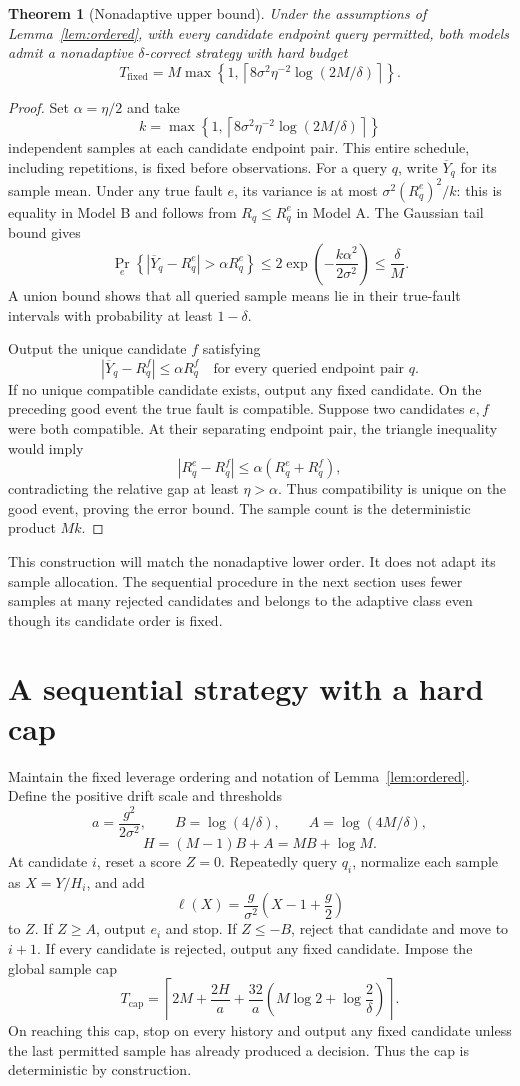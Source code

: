 \documentclass[11pt,letterpaper]{article}
\newtheorem{theorem}{Theorem}
\newcommand{\ceil}[1]{\left\lceil #1\right\rceil}
\begin{document}
\begin{theorem}[Nonadaptive upper bound]\label{thm:nonadaptive-upper}
Under the assumptions of Lemma~\ref{lem:ordered}, with every candidate endpoint query permitted, both models admit a nonadaptive $\delta$-correct strategy with hard budget
\[
 T_{\mathrm{fixed}}=M\max\left\{1,
 \ceil{8\sigma^2\eta^{-2}\log(2M/\delta)}\right\}.
\]
\end{theorem}
\begin{proof}
Set $\alpha=\eta/2$ and take
\[
 k=\max\left\{1,\ceil{8\sigma^2\eta^{-2}\log(2M/\delta)}\right\}
\]
independent samples at each candidate endpoint pair. This entire schedule, including repetitions, is fixed before observations. For a query $q$, write $\overline Y_q$ for its sample mean. Under any true fault $e$, its variance is at most $\sigma^2(R_q^e)^2/k$: this is equality in Model B and follows from $R_q\le R_q^e$ in Model A. The Gaussian tail bound gives
\[
 \Pr_e\left\{|\overline Y_q-R_q^e|>\alpha R_q^e\right\}
 \le2\exp\left(-\frac{k\alpha^2}{2\sigma^2}\right)
 \le\frac\delta M.
\]
A union bound shows that all queried sample means lie in their true-fault intervals with probability at least $1-\delta$.

Output the unique candidate $f$ satisfying
\[
 |\overline Y_q-R_q^f|\le\alpha R_q^f
 \quad\text{for every queried endpoint pair }q.
\]
If no unique compatible candidate exists, output any fixed candidate. On the preceding good event the true fault is compatible. Suppose two candidates $e,f$ were both compatible. At their separating endpoint pair, the triangle inequality would imply
\[
 |R_q^e-R_q^f|\le\alpha(R_q^e+R_q^f),
\]
contradicting the relative gap at least $\eta>\alpha$. Thus compatibility is unique on the good event, proving the error bound. The sample count is the deterministic product $Mk$.
\end{proof}

This construction will match the nonadaptive lower order. It does not adapt its sample allocation. The sequential procedure in the next section uses fewer samples at many rejected candidates and belongs to the adaptive class even though its candidate order is fixed.

\section{A sequential strategy with a hard cap}\label{sec:upper}
Maintain the fixed leverage ordering and notation of Lemma~\ref{lem:ordered}. Define the positive drift scale and thresholds
\[
 a=\frac{g^2}{2\sigma^2},\qquad
 B=\log(4/\delta),\qquad A=\log(4M/\delta),
\]
\[
 H=(M-1)B+A=MB+\log M.
\]
At candidate $i$, reset a score $Z=0$. Repeatedly query $q_i$, normalize each sample as $X=Y/H_i$, and add
\[
 \ell(X)=\frac{g}{\sigma^2}\left(X-1+\frac g2\right)
\]
to $Z$. If $Z\ge A$, output $e_i$ and stop. If $Z\le-B$, reject that candidate and move to $i+1$. If every candidate is rejected, output any fixed candidate. Impose the global sample cap
\[
 T_{\mathrm{cap}}=
 \ceil{2M+\frac{2H}{a}
       +\frac{32}{a}\left(M\log2+\log\frac2\delta\right)}.
\]
On reaching this cap, stop on every history and output any fixed candidate unless the last permitted sample has already produced a decision. Thus the cap is deterministic by construction.
\end{document}
